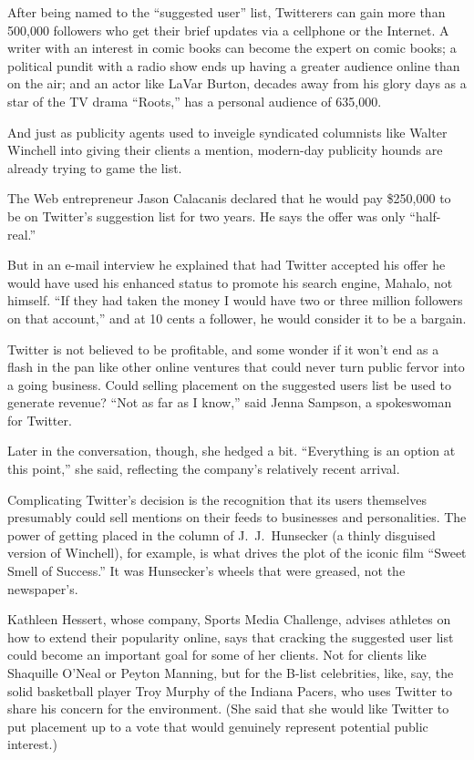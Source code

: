 ﻿\documentclass[12pt,a4paper,onecolumn]{article}
\begin{document}
After being named to the ``suggested user'' list, Twitterers can gain more than 500,000 followers
who get their brief updates via a cellphone or the Internet. A writer with an interest in comic
books can become the expert on comic books; a political pundit with a radio show ends up having a
greater audience online than on the air; and an actor like LaVar Burton, decades away from his glory
days as a star of the TV drama ``Roots,'' has a personal audience of 635,000.

And just as publicity agents used to inveigle syndicated columnists like Walter Winchell into giving
their clients a mention, modern-day publicity hounds are already trying to game the list.

The Web entrepreneur Jason Calacanis declared that he would pay \$250,000 to be on Twitter's
suggestion list for two years. He says the offer was only ``half-real.''

But in an e-mail interview he explained that had Twitter accepted his offer he would have used his
enhanced status to promote his search engine, Mahalo, not himself. ``If they had taken the money I
would have two or three million followers on that account,'' and at 10 cents a follower, he would
consider it to be a bargain.

Twitter is not believed to be profitable, and some wonder if it won't end as a flash in the pan like
other online ventures that could never turn public fervor into a going business. Could selling
placement on the suggested users list be used to generate revenue? ``Not as far as I know,'' said
Jenna Sampson, a spokeswoman for Twitter.

Later in the conversation, though, she hedged a bit. ``Everything is an option at this point,'' she
said, reflecting the company's relatively recent arrival.

Complicating Twitter's decision is the recognition that its users themselves presumably could sell
mentions on their feeds to businesses and personalities. The power of getting placed in the column
of J.~J.~Hunsecker (a thinly disguised version of Winchell), for example, is what drives the plot of
the iconic film ``Sweet Smell of Success.'' It was Hunsecker's wheels that were greased, not the
newspaper's.

Kathleen Hessert, whose company, Sports Media Challenge, advises athletes on how to extend their
popularity online, says that cracking the suggested user list could become an important goal for
some of her clients. Not for clients like Shaquille O'Neal or Peyton Manning, but for the B-list
celebrities, like, say, the solid basketball player Troy Murphy of the Indiana Pacers, who uses
Twitter to share his concern for the environment. (She said that she would like Twitter to put
placement up to a vote that would genuinely represent potential public interest.)
\end{document}
